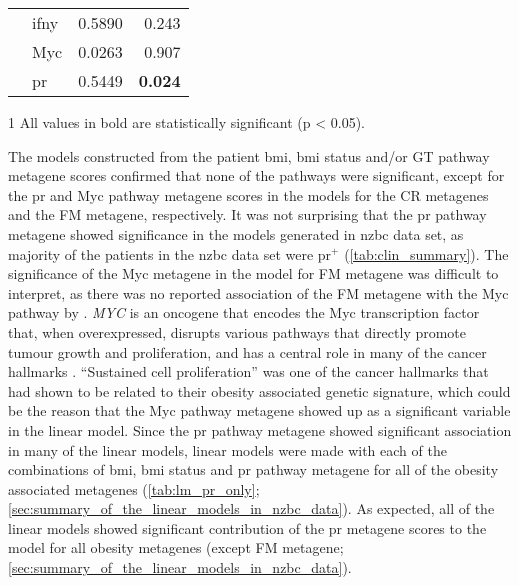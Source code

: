 \begin{table}[htpb]
\begin{threeparttable}
\begin{tabular}{llrr}
                                                                       & \gls{ifny} & 0.5890  & 0.243\\
                                                                       & Myc        & 0.0263  & 0.907\\
                                                                       & \gls{pr}   & 0.5449  & \textbf{0.024}\\
			\hline
			\hline
		\end{tabular}
		\begin{tablenotes}
			\begin{footnotesize}
				\item [1] All values in bold are statistically significant (p \textless{} 0.05).
			\end{footnotesize}
		\end{tablenotes}
	\end{threeparttable}
\end{table}

The models constructed from the patient \gls{bmi}, \gls{bmi} status and/or GT pathway metagene scores confirmed that none of the pathways were significant, except for the \gls{pr} and Myc pathway metagene scores in the models for the CR metagenes and the FM metagene, respectively.
It was not surprising that the \gls{pr} pathway metagene showed significance in the models generated in \gls{nzbc} data set, as majority of the patients in the \gls{nzbc} data set were \gls{pr}$^+$ (\cref{tab:clin_summary}).
The significance of the Myc metagene in the model for FM metagene was difficult to interpret, as there was no reported association of the FM metagene with the Myc pathway by \citet{Fuentes-Mattei2014}.
\textit{MYC} is an oncogene that encodes the Myc transcription factor that, when overexpressed, disrupts various pathways that directly promote tumour growth and proliferation, and has a central role in many of the cancer hallmarks \citep{Coller2000,Hanahan2000}.
``Sustained cell proliferation'' was one of the cancer hallmarks that \citet{Fuentes-Mattei2014} had shown to be related to their obesity associated genetic signature, which could be the reason that the Myc pathway metagene showed up as a significant variable in the linear model.
Since the \gls{pr} pathway metagene showed significant association in many of the linear models, linear models were made with each of the combinations of \gls{bmi}, \gls{bmi} status and \gls{pr} pathway metagene for all of the obesity associated metagenes (\cref{tab:lm_pr_only}; \cref{sec:summary_of_the_linear_models_in_nzbc_data}).
As expected, all of the linear models showed significant contribution of the \gls{pr} metagene scores to the model for all obesity metagenes (except FM metagene; \cref{sec:summary_of_the_linear_models_in_nzbc_data}).

